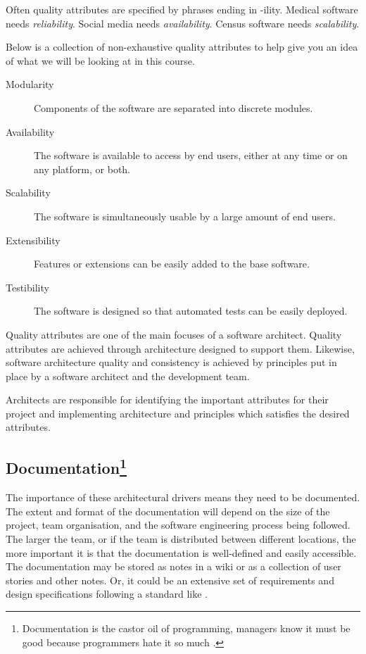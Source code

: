 Often quality attributes are specified by phrases ending in -ility.
Medical software needs \textit{reliability}.
Social media needs \textit{availability}.
Census software needs \textit{scalability}.

Below is a collection of non-exhaustive quality attributes to help give you an idea of what we will be looking at in this course.

\begin{description}
    \item[Modularity] Components of the software are separated into discrete modules.
    \item[Availability] The software is available to access by end users, either at any time or on any platform, or both.
    \item[Scalability] The software is simultaneously usable by a large amount of end users.
    \item[Extensibility] Features or extensions can be easily added to the base software.
    \item[Testibility] The software is designed so that automated tests can be easily deployed.
\end{description}

Quality attributes are one of the main focuses of a software architect.
Quality attributes are achieved through architecture designed to support them.
Likewise, software architecture quality and consistency is achieved by principles put in place by a software architect and the development team.

Architects are responsible for identifying the important attributes for their project
and implementing architecture and principles which satisfies the desired attributes.

\subsection{Documentation\footnote{Documentation is the castor oil of programming,
managers know it must be good because programmers hate it so much \cite{psychprog}.}}

The importance of these architectural drivers means they need to be documented.
The extent and format of the documentation will depend on the size of the project, team organisation,
and the software engineering process being followed.
The larger the team, or if the team is distributed between different locations,
the more important it is that the documentation is well-defined and easily accessible.
The documentation may be stored as notes in a wiki or as a collection of user stories and other notes.
Or, it could be an extensive set of requirements and design specifications following a standard like
.

